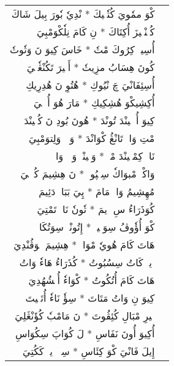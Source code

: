 \documentclass[a4paper, 12pt]{report}
\begin{document}
\begin{longtable}{rl}
\textarabic{كْوَ ممٗويَ كُتٗشٖيكَ  *  نْدِيٗ بٗورَ بِيلَ شَاكَ} & \\ 
\textarabic{كُئٖنْڠٖيزَ أُكِتَاكَ  *  نِ كَامَ نِلٗكْوَمْبِيَ} & \\ 
[8mm] 

\textarabic{أُسِيوٖ كِرُوكَ مْتٗ  *  خَاسَ كِيوَ نَ وَتٗوتٗ} & \\ 
\textarabic{كُونَ هِسَابُ مزِيتٗ  *  أَخٖيرَ تَكُنْڠٗجٖيَ} & \\ 
[8mm] 

\textarabic{أُسِئِفَانْيَ چَ نْيُوكِ  *  هُتُوِ نَ هُدِرِيكِ} & \\ 
\textarabic{أُكِشِيكْوَ هُشِكِيكِ  *  مَارَ هُوَ أُمٖتٖيَ} & \\ 
[8mm] 

\textarabic{كِيوَ أُمٖپٖينْدَ تُونْدَ  *  هُونَ بُودِ نَ كُپٖينْدَ} & \\ 
\textarabic{مْتِ وَاكٖ تَانْڠُ كْوَانْدَ  *  وَزٖئٖ وَلِتوَمْبِيَ} & \\ 
[8mm] 

\textarabic{نَاوٖ كِمْپٖينْدَ مْكٖ  *  وَپٖينْدٖ وَزٖئٖ وَاكٖ} & \\ 
\textarabic{وَاكْوٖ مْبوَاكٗ سِئٖپُوكٖ  *  نَ هِشِيمَ كُوٖكٖيَ} & \\ 
[8mm] 

\textarabic{مُهِشِيمُ وَاكٖ مَامَ  *  پِيَ بَبَاكٖ دَئِيمَ} & \\ 
\textarabic{كُوَذَرَاءُ سِ وٖيمَ  *  تٗونٗ نَاوٖ تَمْتِيَ} & \\ 
[8mm] 

\textarabic{كْوَ أُؤٗوڤُ سِوَنٖينٖ  *  إِتُونْڠٖ سِوَتُكَانٖ} & \\ 
\textarabic{هَاتَ كَامَ هُويٗ مْوَانٖ  *  هِشِيمَ مٖوَڤُنْدِيَ} & \\ 
[8mm] 

\textarabic{وٖيوٖ كَاتُ سِسُبُوتُ  *  كُذَرَاءُ هَاءٗ وَاتُ} & \\ 
\textarabic{هَاتَ كَامَ أُتُكُوتُ  *  كْوَاءٗ أُمٖشُهُدِيَ} & \\ 
[8mm] 

\textarabic{كِيوَ نِ وَاتُ مَتَاتَ  *  سِؤٗ نَاءٗ أُتَتٖيتَ} & \\ 
\textarabic{خٖيرِ مْبَالِ كُئِڤُوتَ  *  نَ مَامْبٗ كُؤَنْڠَلِيَ} & \\ 
[8mm] 

\textarabic{أُكِيوَ أُونَ نَفَاسِ  *  لَ كُوَاپَ سِكُوَاسِ} & \\ 
\textarabic{إِيلَ فَانْيَ كْوَ كِئَاسِ  *  سِيٖ دٖيوٖ كَكُتِيَ} & \\ 
[8mm] 


\end{longtable}
\end{document}
